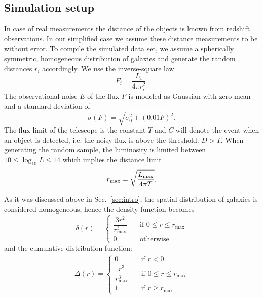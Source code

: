 \subsection{Simulation setup}
\label{sec:simsetup}




In case of real measurements the distance of the objects is known from redshift observations.
In our simplified case we assume these distance measurements to be without error.
To compile the simulated data set, we assume a spherically symmetric, homogeneous distribution of galaxies and generate the random distances $r_i$ accordingly.
We use the inverse-square law
\begin{equation}
F_i = \frac{L_i}{4 \pi r_i^2}.
\end{equation}
The observational noise $E$ of the flux $F$ is modeled as Gaussian with zero mean and a standard deviation of
\begin{equation}
\sigma(F)=\sqrt{\sigma_0^2+(0.01F)^2}.
\label{eq:error}
\end{equation}
The flux limit of the telescope is the constant $T$ and $C$ will denote the event when an object is detected, i.e. the noisy flux is above the threshold: $D > T$.
When generating the random sample, the luminosity is limited between $10 \leq \log_{10}{L} \leq 14$ which implies the distance limit
\begin{equation}
r_\textnormal{max} = \sqrt{\frac{L_\textnormal{max}}{4 \pi T}}.
\end{equation}

As it was discussed above in Sec.~\ref{sec:intro}, the spatial distribution of galaxies is considered homogeneous, hence the density function becomes \begin{equation}\label{eq:dist_dens_func}
\delta(r) = 
\begin{cases} 
    \dfrac{3r^{2}}{r_{\max}^{3}} & \quad \text{if } 0\leq r\leq r_{\max}\\
    0 & \quad \text{otherwise}
\end{cases} 
\end{equation}
and the cumulative distribution function: \begin{align}\label{eq:dist_cum_func} \Delta(r)= \begin{cases} 0 & \quad \text{if } r<0\\ \dfrac{r^{3}}{r_{\max}^{3}} & \quad \text{if } 0\leq r\leq r_{\max}\\ 1 & \quad \text{if } r\geq r_{\max} \end{cases} \end{align}



